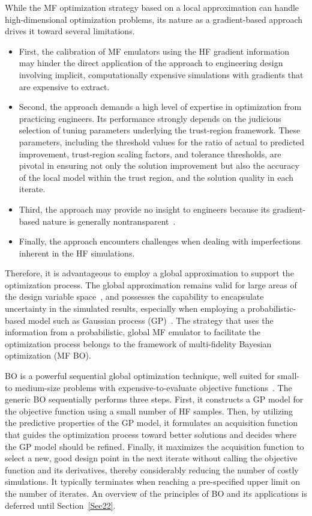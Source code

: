 \documentclass[iicol,sn-basic]{sn-jnl}%
\theoremstyle{thmstyleone}%
\theoremstyle{thmstyletwo}
\theoremstyle{thmstylethree}
\begin{document}
\begin{linenumbers}
While the MF optimization strategy based on a local approximation can handle high-dimensional optimization problems, its nature as a gradient-based approach drives it toward several limitations.
\begin{itemize}
    \item First, the calibration of MF emulators using the HF gradient information may hinder the direct application of the approach to engineering design involving implicit, computationally expensive simulations with gradients that are expensive to extract.
	
    \item Second, the approach demands a high level of expertise in optimization from practicing engineers.
    Its performance strongly depends on the judicious selection of tuning parameters underlying the trust-region framework.
    These parameters, including the threshold values for the ratio of actual to predicted improvement, trust-region scaling factors, and tolerance thresholds, are pivotal in ensuring not only the solution improvement but also the accuracy of the local model within the trust region, and the solution quality in each iterate.
	
    \item Third, the approach may provide no insight to engineers because its gradient-based nature is generally nontransparent~\citep{Wang2006}.
	
    \item Finally, the approach encounters challenges when dealing with imperfections inherent in the HF simulations.
\end{itemize} 

Therefore, it is advantageous to employ a global approximation to support the optimization process.
The global approximation remains valid for large areas of the design variable space~\citep{Barthelemy1993}, and possesses the capability to encapsulate uncertainty in the simulated results, especially when employing a probabilistic-based model such as Gaussian process (GP)~\citep{Rasmussen2006}.
The strategy that uses the information from a probabilistic, global MF emulator to facilitate the optimization process belongs to the framework of multi-fidelity Bayesian optimization (MF BO).

BO is a powerful sequential global optimization technique, well suited for small- to medium-size problems with expensive-to-evaluate objective functions~\citep{Snoek2012,Shahriari2016,Frazier2018}.
The generic BO sequentially performs three steps.
First, it constructs a GP model for the objective function using a small number of HF samples.
Then, by utilizing the predictive properties of the GP model, it formulates an acquisition function that guides the optimization process toward better solutions and decides where the GP model should be refined.
Finally, it maximizes the acquisition function to select a new, good design point in the next iterate without calling the objective function and its derivatives, thereby considerably reducing the number of costly simulations.
It typically terminates when reaching a pre-specified upper limit on the number of iterates.
An overview of the principles of BO and its applications is deferred until Section~\ref{Sec22}.  


\end{linenumbers}
\end{document}
